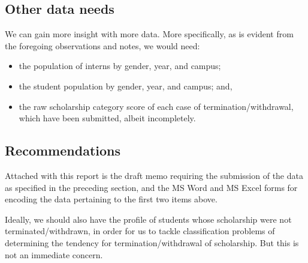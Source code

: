 \documentclass[a4paper]{article}
\providecommand{\tightlist}{%
  \setlength{\itemsep}{0pt}\setlength{\parskip}{0pt}}
\begin{document}
\hypertarget{other-data-needs}{%
\subsection{Other data needs}\label{other-data-needs}}

We can gain more insight with more data. More specifically, as is
evident from the foregoing observations and notes, we would need:

\begin{itemize}
\tightlist
\item
  the population of interns by gender, year, and campus;
\item
  the student population by gender, year, and campus; and,
\item
  the raw scholarship category score of each case of
  termination/withdrawal, which have been submitted, albeit
  incompletely.
\end{itemize}

\hypertarget{recommendations}{%
\subsection{Recommendations}\label{recommendations}}

Attached with this report is the draft memo requiring the submission of
the data as specified in the preceding section, and the MS Word and MS
Excel forms for encoding the data pertaining to the first two items
above.

Ideally, we should also have the profile of students whose scholarship
were not terminated/withdrawn, in order for us to tackle classification
problems of determining the tendency for termination/withdrawal of
scholarship. But this is not an immediate concern.
\end{document}
